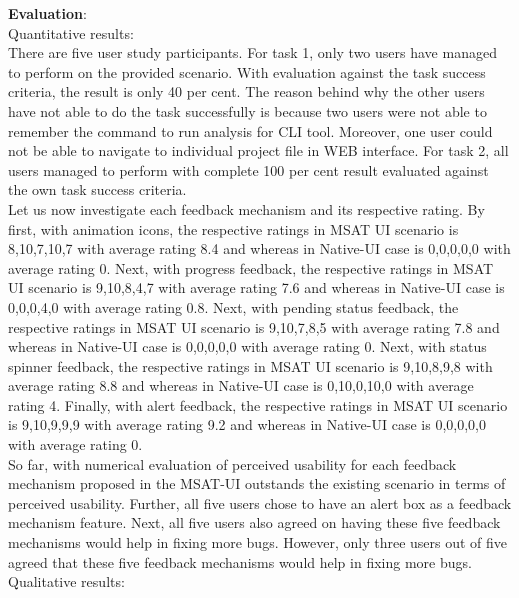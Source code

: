 \textbf{Evaluation}: \\

Quantitative results: \\

There are five user study participants. For task 1, only two users have managed to perform on the provided scenario. With evaluation against the task success criteria, the result is only 40 per cent. The reason behind why the other users have not able to do the task successfully is because two users were not able to remember the command to run analysis for CLI tool. Moreover, one user could not be able to navigate to individual project file in WEB interface. For task 2, all users managed to perform with complete 100 per cent result evaluated against the own task success criteria. \\

Let us now investigate each feedback mechanism and its respective rating. By first, with animation icons, the respective ratings in MSAT UI scenario is 8,10,7,10,7 with average rating 8.4 and whereas in Native-UI case is 0,0,0,0,0 with average rating 0. Next, with progress feedback, the respective ratings in MSAT UI scenario is 9,10,8,4,7 with average rating 7.6 and whereas in Native-UI case is 0,0,0,4,0 with average rating 0.8. Next, with pending status feedback, the respective ratings in MSAT UI scenario is 9,10,7,8,5 with average rating 7.8 and whereas in Native-UI case is 0,0,0,0,0 with average rating 0. Next, with status spinner feedback, the respective ratings in MSAT UI scenario is 9,10,8,9,8 with average rating 8.8 and whereas in Native-UI case is 0,10,0,10,0 with average rating 4. Finally, with alert feedback, the respective ratings in MSAT UI scenario is 9,10,9,9,9 with average rating 9.2 and whereas in Native-UI case is 0,0,0,0,0 with average rating 0. \\

So far, with numerical evaluation of perceived usability for each feedback mechanism proposed in the MSAT-UI outstands the existing scenario in terms of perceived usability. 
Further, all five users chose to have an alert box as a feedback mechanism feature. Next, all five users also agreed on having these five feedback mechanisms would help in fixing more bugs. However, only three users out of five agreed that these five feedback mechanisms would help in fixing more bugs. \\

Qualitative results: \\


